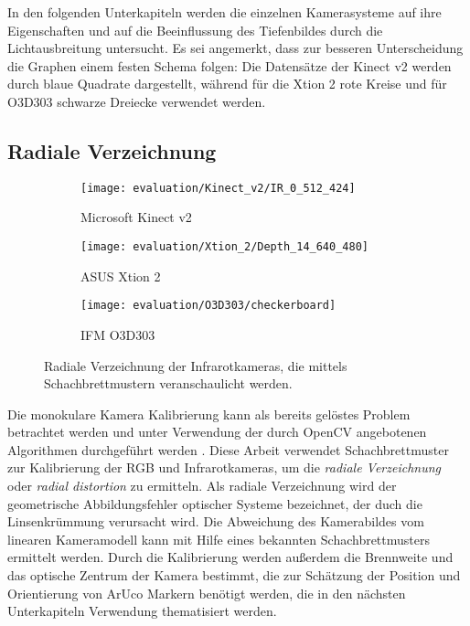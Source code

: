 \documentclass[thesis.tex]{subfiles}
\begin{document}
In den folgenden Unterkapiteln werden die einzelnen Kamerasysteme auf ihre Eigenschaften und auf die Beeinflussung des Tiefenbildes durch die Lichtausbreitung untersucht. Es sei angemerkt, dass zur besseren Unterscheidung die Graphen einem festen Schema folgen: Die Datensätze der Kinect v2 werden durch blaue Quadrate dargestellt, während für die Xtion 2 rote Kreise und für O3D303 schwarze Dreiecke verwendet werden.
%
\subsection{Radiale Verzeichnung}\label{sec:radial_distortion}
%
\begin{figure}[h!]
\centering
\begin{subfigure}{.32\textwidth}
    \centering
    \texttt{[image: evaluation/Kinect\_v2/IR\_0\_512\_424]}
    \caption{Microsoft Kinect v2}
    \label{fig:Kinect_v2_Checkerboard}
\end{subfigure}%
\begin{subfigure}{.32\textwidth}
    \centering
    \texttt{[image: evaluation/Xtion\_2/Depth\_14\_640\_480]}
    \caption{ASUS Xtion 2}
    \label{fig:Xtion_2_Checkerboard}
\end{subfigure}
\begin{subfigure}{.32\textwidth}
    \centering
    \texttt{[image: evaluation/O3D303/checkerboard]}
    \caption{IFM O3D303}
    \label{fig:IFM_O3D303_Checkerboard}
\end{subfigure}
\caption{Radiale Verzeichnung der Infrarotkameras, die mittels Schachbrettmustern veranschaulicht werden.}
\end{figure}

Die monokulare Kamera Kalibrierung kann als bereits \glq gelöstes Problem\grq{} betrachtet werden und unter Verwendung der durch OpenCV angebotenen Algorithmen durchgeführt werden \cite{bib:Hertzberg2014}. Diese Arbeit verwendet Schachbrettmuster zur Kalibrierung der RGB und Infrarotkameras, um die \emph{radiale Verzeichnung} oder \emph{radial distortion} zu ermitteln. Als radiale Verzeichnung wird der geometrische Abbildungsfehler optischer Systeme bezeichnet, der duch die Linsenkrümmung verursacht wird. Die Abweichung des Kamerabildes vom linearen Kameramodell kann mit Hilfe eines bekannten Schachbrettmusters ermittelt werden. Durch die Kalibrierung werden außerdem die Brennweite und das optische Zentrum der Kamera bestimmt, die zur Schätzung der Position und Orientierung von ArUco Markern benötigt werden, die in den nächsten Unterkapiteln Verwendung thematisiert werden.
\end{document}
